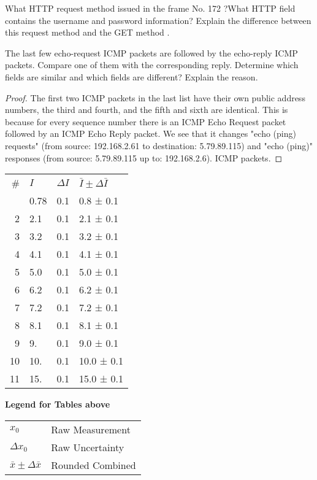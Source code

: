 \documentclass[../../main.tex]{subfiles}
\begin{document}
\begin{wts}
What HTTP request method issued in the frame No. 172 ?What HTTP field contains the username and password information? Explain the difference between this request method and the GET method .
\end{wts}
\begin{wts}
    The last few echo-request ICMP packets are followed by the echo-reply ICMP packets. Compare one of them with the corresponding reply. Determine which fields are similar and which fields are different? Explain the reason.
\end{wts}
\begin{proof}
    The first two ICMP packets in the last list have their own public address numbers, the third and fourth, and the fifth and sixth are identical. This is because for every sequence number there is an ICMP Echo Request packet followed by an ICMP Echo Reply packet. We see that it changes "echo (ping) requests" (from source: 192.168.2.61 to destination: 5.79.89.115) and "echo (ping)" responses (from source: 5.79.89.115 up to: 192.168.2.6). ICMP packets.
\end{proof}
\begin{tabularx}{\textwidth}{@{}r*{3}{l}@{}}
\cmidrule[0.75pt](r){1-4}\addlinespace[0.2em]
\# & $I$ & $\Delta I$ & $\bar I\pm\Delta \bar I$ \tabularnewline \cmidrule[0.5pt](r){1-4}\addlinespace[0.2em] 
1 & 0.78 & 0.1 & 0.8 ± 0.1 \tabularnewline  
2 & 2.1 & 0.1 & 2.1 ± 0.1 \tabularnewline  
3 & 3.2 & 0.1 & 3.2 ± 0.1 \tabularnewline  
4 & 4.1 & 0.1 & 4.1 ± 0.1 \tabularnewline  
5 & 5.0 & 0.1 & 5.0 ± 0.1 \tabularnewline  
6 & 6.2 & 0.1 & 6.2 ± 0.1 \tabularnewline  
7 & 7.2 & 0.1 & 7.2 ± 0.1 \tabularnewline  
8 & 8.1 & 0.1 & 8.1 ± 0.1 \tabularnewline  
9 & 9. & 0.1 & 9.0 ± 0.1 \tabularnewline  
10 & 10. & 0.1 & 10.0 ± 0.1 \tabularnewline  
11 & 15. & 0.1 & 15.0 ± 0.1 \tabularnewline  

\cmidrule[0.75pt](r){1-4}
\end{tabularx}
\label{tab:1}

\caption{\textbf{Legend for Tables above}}
\begin{tabular}{@{}l|l@{}}
\toprule$x_0$ & Raw Measurement\\
$\Delta x_0$ & Raw Uncertainty\\
$\bar x\pm\Delta \bar x$ & Rounded Combined\\
\end{tabular}
\end{document}
